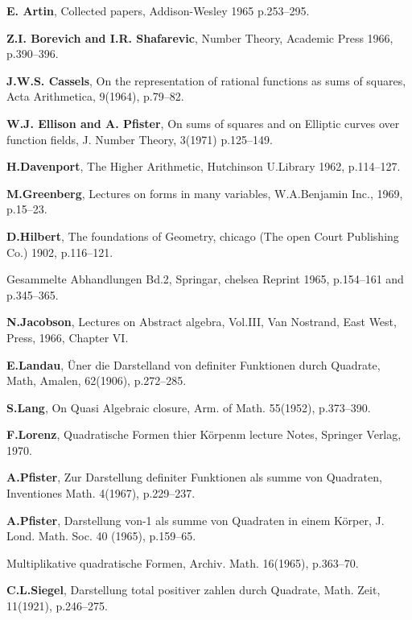 \begin{thebibliography}{99}
\textbf{E. Artin}, Collected papers, Addison-Wesley 1965 p.253--295.

\textbf{Z.I. Borevich and I.R. Shafarevic}, Number Theory, Academic Press 1966,
p.390--396.

\textbf{J.W.S. Cassels}, On the representation of rational functions as sums of
squares, Acta Arithmetica, 9(1964), p.79--82.

\textbf{W.J. Ellison and A. Pfister}, On sums of squares and on
Elliptic curves over function fields, J. Number Theory, 3(1971)
p.125--149.

\textbf{H.Davenport}, The Higher Arithmetic, Hutchinson U.Library
1962, p.114--127.

\textbf{M.Greenberg}, Lectures on forms in many variables,
W.A.Benjamin Inc., 1969, p.15--23.

\textbf{D.Hilbert}, The foundations of Geometry, chicago (The open
Court Publishing Co.) 1902, p.116--121.

Gesammelte Abhandlungen Bd.2, Springar, chelsea Reprint 1965,
p.154--161 and p.345--365.

\textbf{N.Jacobson}, Lectures on Abstract algebra, Vol.III, Van
Nostrand, East West, Press, 1966, Chapter VI.

\textbf{E.Landau}, \"{U}ner die Darstelland von definiter Funktionen
durch Quadrate, Math, Amalen, 62(1906), p.272--285.

\textbf{S.Lang}, On Quasi Algebraic closure, Arm. of Math. 55(1952),
p.373--390.

\textbf{F.Lorenz}, Quadratische Formen thier K\"{o}rpenm lecture
Notes, Springer Verlag, 1970.

\textbf{A.Pfister}, Zur Darstellung definiter Funktionen als summe von
Quadraten, Inventiones Math. 4(1967), p.229--237.

\textbf{A.Pfister}, Darstellung von-1 als summe von Quadraten in einem
K\"{o}rper, J. Lond. Math. Soc. 40 (1965), p.159--65.

Multiplikative quadratische Formen, Archiv. Math. 16(1965), p.363--70.

\textbf{C.L.Siegel}, Darstellung total positiver zahlen  durch
Quadrate, Math. Zeit, 11(1921), p.246--275.
\end{thebibliography}

